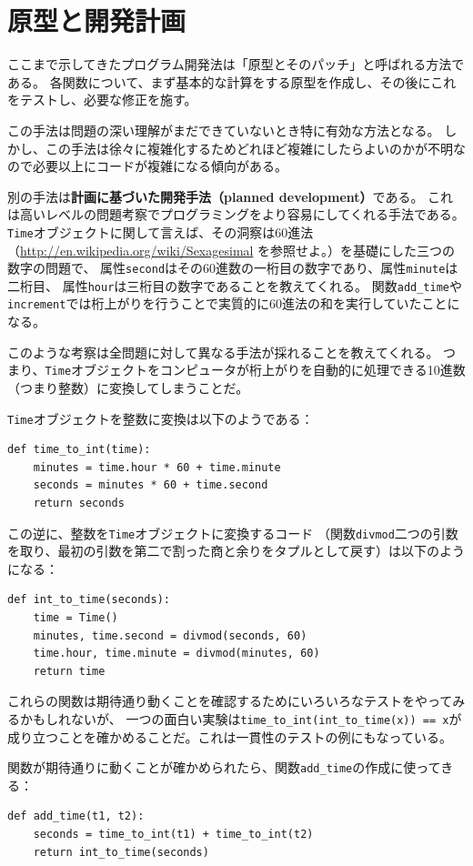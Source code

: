 \documentclass[a4j,12pt,makeidx]{jbook}
\begin{document}
\section{原型と開発計画}
ここまで示してきたプログラム開発法は「原型とそのパッチ」と呼ばれる方法である。
各関数について、まず基本的な計算をする原型を作成し、その後にこれをテストし、必要な修正を施す。\par
この手法は問題の深い理解がまだできていないとき特に有効な方法となる。
しかし、この手法は徐々に複雑化するためどれほど複雑にしたらよいのかが不明なので必要以上にコードが複雑になる傾向がある。\par
別の手法は{\bf 計画に基づいた開発手法（planned development）}である。
これは高いレベルの問題考察でプログラミングをより容易にしてくれる手法である。
{\tt Time}オブジェクトに関して言えば、その洞察は60進法（\url{http://en.wikipedia.org/wiki/Sexagesimal}
を参照せよ。）を基礎にした三つの数字の問題で、
属性{\tt second}はその60進数の一桁目の数字であり、属性{\tt minute}は二桁目、
属性{\tt hour}は三桁目の数字であることを教えてくれる。
関数{\tt add\_time}や{\tt increment}では桁上がりを行うことで実質的に60進法の和を実行していたことになる。\par
このような考察は全問題に対して異なる手法が採れることを教えてくれる。
つまり、{\tt Time}オブジェクトをコンピュータが桁上がりを自動的に処理できる10進数（つまり整数）に変換してしまうことだ。\par
{\tt Time}オブジェクトを整数に変換は以下のようである：
\begin{verbatim}
def time_to_int(time):
    minutes = time.hour * 60 + time.minute
    seconds = minutes * 60 + time.second
    return seconds
\end{verbatim}
この逆に、整数を{\tt Time}オブジェクトに変換するコード
（関数{\tt divmod}二つの引数を取り、最初の引数を第二で割った商と余りをタプルとして戻す）は以下のようになる：
\begin{verbatim}
def int_to_time(seconds):
    time = Time()
    minutes, time.second = divmod(seconds, 60)
    time.hour, time.minute = divmod(minutes, 60)
    return time
\end{verbatim} \par
これらの関数は期待通り動くことを確認するためにいろいろなテストをやってみるかもしれないが、
一つの面白い実験は{\verb"time_to_int(int_to_time(x)) == x"}が成り立つことを確かめることだ。これは一貫性のテストの例にもなっている。\par
関数が期待通りに動くことが確かめられたら、関数{\tt add\_time}の作成に使ってきる：
\begin{verbatim}
def add_time(t1, t2):
    seconds = time_to_int(t1) + time_to_int(t2)
    return int_to_time(seconds)
\end{verbatim}
\end{document}
